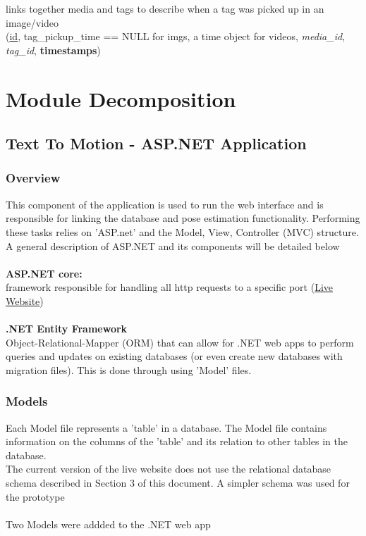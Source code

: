 \documentclass{scrreprt}
\begin{document}
links together media and tags to describe when a tag was picked up in an image/video
\\
(\underline{id}, tag\_pickup\_time == NULL for imgs, a time object for videos, \textit{media\_id}, \textit{tag\_id}, \textbf{timestamps})

\chapter{Module Decomposition}

\section{Text To Motion - ASP.NET Application}


\subsection{Overview}
This component of the application is used to run the web interface and is responsible for linking the database and pose estimation functionality. Performing these tasks relies on 'ASP.net' and the Model, View, Controller (MVC) structure. A general description of ASP.NET and its components will be detailed below
\\\\
\textbf{ASP.NET core:}
\\
framework responsible for handling all http requests to a specific port (\href{159.203.10.112}{Live Website})
\\\\
\textbf{.NET Entity Framework}
\\Object-Relational-Mapper (ORM) that can allow for .NET web apps to perform queries and updates on existing databases (or even create new databases with migration files). This is done through using 'Model' files.

\subsection{Models}

Each Model file represents a 'table' in a database. The Model file contains information on the columns of the 'table' and its relation to other tables in the database.
\\
The current version of the live website does not use the relational database schema described in Section 3 of this document. A simpler schema was used for the prototype
\\\\
Two Models were addded to the .NET web app
\end{document}
